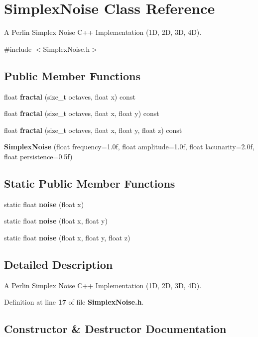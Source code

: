 \section{Simplex\+Noise Class Reference}
\label{class_simplex_noise}


A Perlin Simplex Noise C++ Implementation (1D, 2D, 3D, 4D).  




{\ttfamily \#include $<$Simplex\+Noise.\+h$>$}

\subsection*{Public Member Functions}
\begin{DoxyCompactItemize}
\item 
float \textbf{ fractal} (size\+\_\+t octaves, float x) const
\item 
float \textbf{ fractal} (size\+\_\+t octaves, float x, float y) const
\item 
float \textbf{ fractal} (size\+\_\+t octaves, float x, float y, float z) const
\item 
\textbf{ Simplex\+Noise} (float frequency=1.\+0f, float amplitude=1.\+0f, float lacunarity=2.\+0f, float persistence=0.\+5f)
\end{DoxyCompactItemize}
\subsection*{Static Public Member Functions}
\begin{DoxyCompactItemize}
\item 
static float \textbf{ noise} (float x)
\item 
static float \textbf{ noise} (float x, float y)
\item 
static float \textbf{ noise} (float x, float y, float z)
\end{DoxyCompactItemize}


\subsection{Detailed Description}
A Perlin Simplex Noise C++ Implementation (1D, 2D, 3D, 4D). 

Definition at line \textbf{ 17} of file \textbf{ Simplex\+Noise.\+h}.



\subsection{Constructor \& Destructor Documentation}
\mbox{\label{class_simplex_noise_a6981510da521395c25be9e9ad2fdbda0}} 
